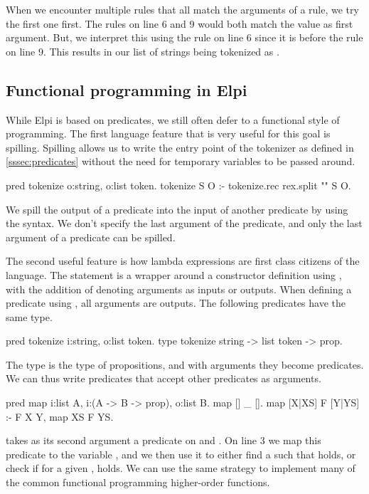 \documentclass[thesis.tex]{subfiles}
\begin{document}
{{When we encounter multiple rules that all match the arguments of a rule, we try the first one first. The rules on line 6 and 9 would both match the value \elpii{["/", "/", "="]} as first argument. But, we interpret this using the rule on line 6 since it is before the rule on line 9. This results in our list of strings being tokenized as .

\subsection{Functional programming in Elpi}
While Elpi is based on predicates, we still often defer to a functional style of programming. The first language feature that is very useful for this goal is spilling. Spilling allows us to write the entry point of the tokenizer as defined in \cref{sssec:predicates} without the need for temporary variables to be passed around.
\begin{elpicode}
  pred tokenize o:string, o:list token.
  tokenize S O :- tokenize.rec {rex.split "" S} O.
\end{elpicode}

We spill the output of a predicate into the input of another predicate by using the \elpii{{ }} syntax. We don't specify the last argument of the predicate, and only the last argument of a predicate can be spilled.

The second useful feature is how lambda expressions are first class citizens of the language. The  statement is a wrapper around a constructor definition using , with the addition of denoting arguments as inputs or outputs. When defining a predicate using , all arguments are outputs. The following predicates have the same type.
\begin{elpicode}
  pred tokenize i:string, o:list token.
  type tokenize string -> list token -> prop.
\end{elpicode}
The  type is the type of propositions, and with arguments they become predicates. We can thus write predicates that accept other predicates as arguments.
\begin{elpicode}
  pred map i:list A, i:(A -> B -> prop), o:list B.
  map [] _ [].
  map [X|XS] F [Y|YS] :- F X Y, map XS F YS.
\end{elpicode}
 takes as its second argument a predicate on  and . On line 3 we map this predicate to the variable , and we then use it to either find a  such that  holds, or check if for a given ,  holds. We can use the same strategy to implement many of the common functional programming higher-order functions.

}}
\end{document}

